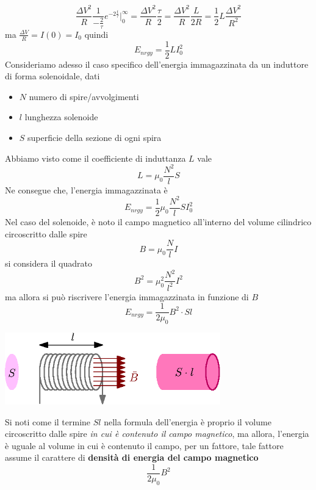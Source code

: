 \documentclass[10pt, letterpaper]{report}
\begin{document}
$$\frac{\Delta V^2}{R}\frac{1}{-\frac{2}{\tau}}e^{-2\frac{t}{\tau}}\Bigg|_0^\infty =\frac{\Delta V^2}{R}\frac{\tau}{2} =\frac{\Delta V^2}{R}\frac{L}{2R}=\frac{1}{2}L\frac{\Delta V^2}{R^2} $$
ma $\frac{\Delta V}{R}=I(0)=I_0$ quindi 
$$E_{nrgy}=\frac{1}{2}LI_0^2 $$
Consideriamo adesso il caso specifico dell'energia immagazzinata da un induttore di forma solenoidale, dati\begin{itemize}
    \item $N$ numero di spire/avvolgimenti 
    \item $l$ lunghezza solenoide 
    \item $S$ superficie della sezione di ogni spira
\end{itemize}
Abbiamo visto come il coefficiente di induttanza $L$ vale 
$$ L=\mu_0\frac{N^2}{l}S$$
Ne consegue che, l'energia immagazzinata è 
$$E_{nrgy}=\frac{1}{2}\mu_0\frac{N^2}{l}SI_0^2 $$
Nel caso del solenoide, è noto il campo magnetico all'interno del volume cilindrico circoscritto dalle spire
$$ B=\mu_0\frac{N}{l}I$$
si considera il quadrato 
$$ B^2=\mu_0^2\frac{N^2}{l^2}I^2$$
ma allora si può riscrivere l'energia immagazzinata in funzione di $B$
$$E_{nrgy}=\frac{1}{2\mu_0}B^2\cdot Sl$$\begin{center}
    \includegraphics[width=0.7\textwidth]{images/solenoide3.eps}
\end{center}
Si noti come il termine $Sl$ nella formula dell'energia è proprio il volume circoscritto dalle spire \textit{in cui è contenuto il campo magnetico}, ma allora, l'energia è uguale al volume in cui è contenuto il campo, per un fattore, tale fattore assume il carattere di \textbf{densità di energia del campo magnetico}
$$\frac{1}{2\mu_0}B^2$$
\flowerLine 
\end{document}
